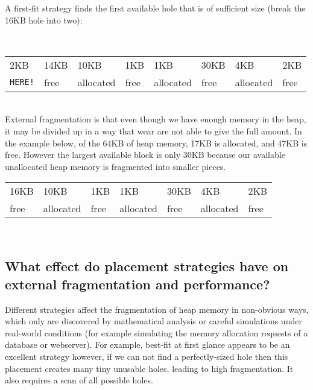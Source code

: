 A first-fit strategy finds the first available hole that is of sufficient size (break the 16KB hole into two):

\\
\begin{center}
\begin{tabularx}{\textwidth}{ | X | X | X | X | X | X | X | X | }
\hline
2KB & 14KB & 10KB & 1KB & 1KB & 30KB & 4KB & 2KB \\
\texttt{HERE!} & free & allocated & free & allocated & free & allocated & free \\
\hline
\end{tabularx}
\end{center}
\\

External fragmentation is that even though we have enough memory in the heap, it may be divided up in a way that wear are not able to give the full amount. In the example below, of the 64KB of heap memory, 17KB is allocated, and 47KB is free. However the largest available block is only 30KB because our available unallocated heap memory is fragmented into smaller pieces.
\\
\begin{center}
\begin{tabularx}{\textwidth}{ | X | X | X | X | X | X | X | }
\hline
16KB & 10KB & 1KB & 1KB & 30KB & 4KB & 2KB \\
free & allocated & free & allocated & free & allocated & free \\
\hline
\end{tabularx}
\end{center}
\\

\subsection{What effect do placement strategies have on external fragmentation and performance?}

Different strategies affect the fragmentation of heap memory in non-obvious ways, which only are discovered by mathematical analysis or careful simulations under real-world conditions (for example simulating the memory allocation requests of a database or webserver). For example, best-fit at first glance appears to be an excellent strategy however, if we can not find a perfectly-sized hole then this placement creates many tiny unusable holes, leading to high fragmentation. It also requires a scan of all possible holes.

